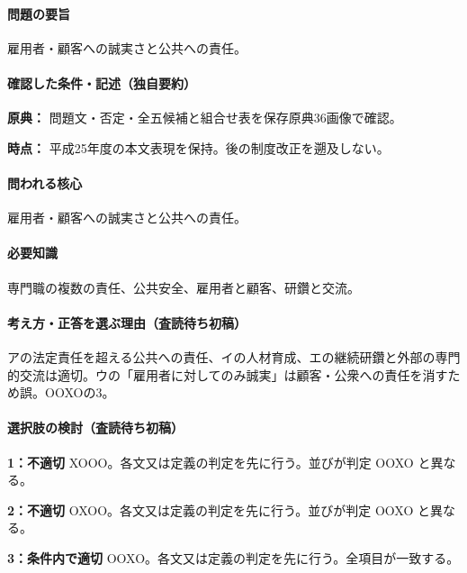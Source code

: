 \paragraph{問題の要旨} 雇用者・顧客への誠実さと公共への責任。

\paragraph{確認した条件・記述（独自要約）}\mbox{}\par

\noindent\textbf{原典：} 問題文・否定・全五候補と組合せ表を保存原典36画像で確認。\par

\noindent\textbf{時点：} 平成25年度の本文表現を保持。後の制度改正を遡及しない。\par

\paragraph{問われる核心} 雇用者・顧客への誠実さと公共への責任。

\paragraph{必要知識} 専門職の複数の責任、公共安全、雇用者と顧客、研鑽と交流。

\paragraph{考え方・正答を選ぶ理由（査読待ち初稿）} アの法定責任を超える公共への責任、イの人材育成、エの継続研鑽と外部の専門的交流は適切。ウの「雇用者に対してのみ誠実」は顧客・公衆への責任を消すため誤。OOXOの3。

\paragraph{選択肢の検討（査読待ち初稿）}\mbox{}\par

\noindent\textbf{1：不適切} XOOO。各文又は定義の判定を先に行う。並びが判定 OOXO と異なる。\par

\noindent\textbf{2：不適切} OXOO。各文又は定義の判定を先に行う。並びが判定 OOXO と異なる。\par

\noindent\textbf{3：条件内で適切} OOXO。各文又は定義の判定を先に行う。全項目が一致する。\par

